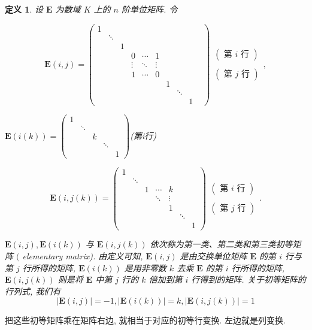 \documentclass{article}
\newtheorem{mydef}{定义}
\begin{document}
\begin{mydef}
设 $\boldsymbol{E}$ 为数域 $K$ 上的 $n$ 阶单位矩阵. 令

$$
	\boldsymbol{E}(i, j)=\left(
	\begin{array}{llllllllll}
		1 & & & & & & & & \\
		& \ddots & & & & & & & & \\
		& & 1 & & & & & & & \\
		& & & 0 & \cdots & 1 & & & & \\
		& & & \vdots & \ddots & \vdots & & & & \\
		& & & 1 & \cdots & 0 & & & \\
		& & & & & & 1 & & \\
		& & & & & & & \ddots & \\
		& & & & & & & & 1
	\end{array}\right)
 \begin{array}{c}(\text { 第 } i \text { 行 }) \\
	\\
	(\text { 第 } j \text { 行 })\end{array},
$$


\centerline{$
\boldsymbol{E}(i(k))=\left(\begin{array}{ccccc}1 & & & & \\ & \ddots & & & \\ & & k & & \\ & & & \ddots & \\ & & & & 1
\end{array}\right)
$(第i行)}
$$
\boldsymbol{E}(i, j(k))=\left(\begin{array}{cccccccc}
	1 & & & & & \\
	 & \ddots & & & & & \\
	  & & 1 & \cdots & k & & \\
	   & & & \ddots & \vdots & & \\
	    & & & & 1 & & \\
	     & & & & & \ddots & \\
	     & & & & & & 1
     \end{array}\right)
 \begin{array}{c}(\text { 第 } i \text { 行 }) \\
 	\\
 	 (\text { 第 } j \text { 行 })\end{array}.
$$

$\boldsymbol{E}(i, j), \boldsymbol{E}(i(k))$ 与 $\boldsymbol{E}(i, j(k))$ 依次称为第一类、第二类和第三类初等矩阵 $($ elementary matrix).
由定义可知, $\boldsymbol{E}(i, j)$ 是由交换单位矩阵 $\boldsymbol{E}$ 的第 $i$ 行与第 $j$ 行所得的矩阵, $\boldsymbol{E}(i(k))$ 是用非零数 $k$ 去乘 $\boldsymbol{E}$ 的第 $i$ 行所得的矩阵, $\boldsymbol{E}(i, j(k))$ 则是将 $\boldsymbol{E}$ 中第 $j$ 行的 $k$ 倍加到第 $i$ 行得到的矩阵.
关于初等矩阵的行列式, 我们有
$$
|\boldsymbol{E}(i, j)|=-1,|\boldsymbol{E}(i(k))|=k,|\boldsymbol{E}(i, j(k))|=1
$$
\end{mydef}
把这些初等矩阵乘在矩阵右边, 就相当于对应的初等行变换. 左边就是列变换.
\end{document}

